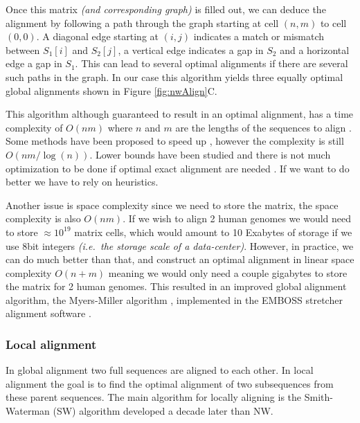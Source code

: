 \documentclass[
  11pt,
  twoside,
  BCOR=10mm,
  listof=totoc]{scrbook}
\begin{document}
Once this matrix \emph{(and corresponding graph)} is filled out, we can deduce the alignment by following a path through the graph starting at cell \((n,m)\) to cell \((0,0)\). A diagonal edge starting at \((i,j)\) indicates a match or mismatch between \(S_1[i]\) and \(S_2[j]\), a vertical edge indicates a gap in \(S_2\) and a horizontal edge a gap in \(S_1\). This can lead to several optimal alignments if there are several such paths in the graph. In our case this algorithm yields three equally optimal global alignments shown in Figure \ref{fig:nwAlign}C.

This algorithm although guaranteed to result in an optimal alignment, has a time complexity of \(O(nm)\) where \(n\) and \(m\) are the lengths of the sequences to align \autocite{sungAlgorithmsBioinformaticsPractical2011}. Some methods have been proposed to speed up \autocite{masekFasterAlgorithmComputing1980}, however the complexity is still \(O(nm/\log(n))\). Lower bounds have been studied and there is not much optimization to be done if optimal exact alignment are needed \autocite{vinhInformationTheoreticMeasures2010,ullmanBoundsComplexityLongest1976}. If we want to do better we have to rely on heuristics.

Another issue is space complexity since we need to store the matrix, the space complexity is also \(O(nm)\). If we wish to align 2 human genomes we would need to store \(\approx 10^{19}\) matrix cells, which would amount to 10 Exabytes of storage if we use 8bit integers \emph{(i.e.~the storage scale of a data-center)}. However, in practice, we can do much better than that, and construct an optimal alignment in linear space complexity \(O(n+m)\) \autocite{hirschbergLinearSpaceAlgorithm1975} meaning we would only need a couple gigabytes to store the matrix for 2 human genomes. This resulted in an improved global alignment algorithm, the Myers-Miller algorithm \autocite{myersOptimalAlignmentsLinear1988}, implemented in the EMBOSS stretcher alignment software \autocite{riceEMBOSSEuropeanMolecular2000}.

\hypertarget{local-alignment}{%
\subsubsection{Local alignment}\label{local-alignment}}

In global alignment two full sequences are aligned to each other. In local alignment the goal is to find the optimal alignment of two subsequences from these parent sequences. The main algorithm for locally aligning is the Smith-Waterman (SW) algorithm \autocite{smithIdentificationCommonMolecular1981} developed a decade later than NW.
\end{document}
